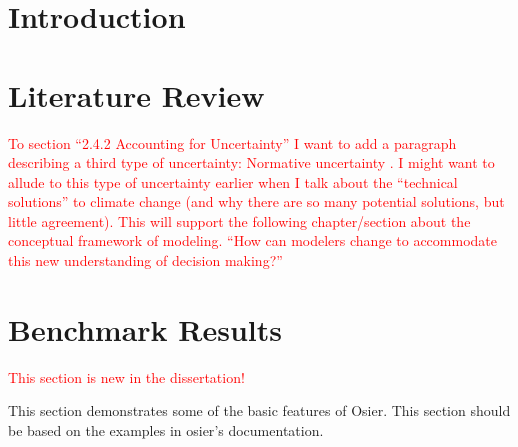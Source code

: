 \chapter{Introduction}
\chapter{Literature Review}
\label{chapter:lit-review}

\textcolor{red}{To section ``2.4.2 Accounting for Uncertainty'' I want to add 
a paragraph describing a third type of uncertainty: Normative uncertainty 
\cite{taebi_governing_2020}. I might want to allude to this type of uncertainty
earlier when I talk about the ``technical solutions'' to climate change (and why
there are so many potential solutions, but little agreement). This will support
the following chapter/section about the conceptual framework of modeling. ``How
can modelers change to accommodate this new understanding of decision making?''}




% 


\chapter{Benchmark Results}


\textcolor{red}{This section is new in the dissertation!}

This section demonstrates some of the basic features of Osier. This section should be based 
on the examples in \ac{osier}'s documentation.


